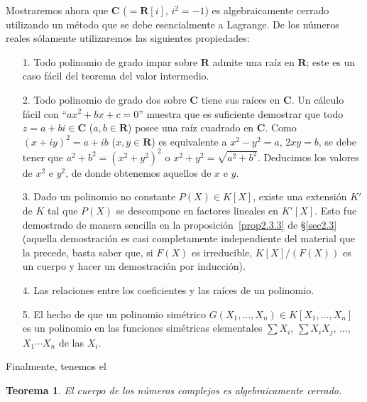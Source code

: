 \documentclass[oneside,bibtotoc,leqno,spanish]{amsbook}
\newcommand{\RR}{\mathbf{R}}
\newcommand{\CC}{\mathbf{C}}
\numberwithin{equation}{section}
\theoremstyle{defi}
\theoremstyle{note}
\newtheorem*{theorem*}{Teorema}
\theoremstyle{rem}
\numberwithin{theorem}{section}
\numberwithin{proposition}{section}
\numberwithin{definition}{section}
\numberwithin{lemma}{section}
\numberwithin{corollary}{section}
\numberwithin{example}{section}
\numberwithin{footnote}{section}%
\begin{document}
Mostraremos ahora que $\CC$ ($=\RR[i]$, $i^{2}=-1$) es algebraicamente cerrado utilizando un m\'etodo
que se debe esencialmente a Lagrange. De los n\'umeros reales s\'olamente utilizaremos
las siguientes propiedades:
\begin{enumerate}
\item[1.] Todo polinomio de grado impar sobre $\RR$ admite una ra\'iz en $\RR$; este es un caso f\'acil del teorema
del valor intermedio.
\item[2.] Todo polinomio de grado dos sobre $\CC$ tiene sus ra\'ices en $\CC$. Un c\'alculo f\'acil con
``$ax^{2}+bx+c=0$'' muestra que es suficiente demostrar que todo $z=a+bi\in\CC$ ($a,b\in\RR$) posee una
ra\'iz cuadrado en $\CC$. Como $(x+iy)^{2}=a+ib$ ($x,y\in\RR$) es equivalente a $x^{2}-y^{2}=a$,
$2xy = b$, se debe tener que $a^{2}+b^{2}=(x^{2}+y^{2})^{2}$ o $x^{2}+y^{2} = \sqrt{a^{2}+b^{2}}$. Deducimos
los valores de $x^{2}$ e $y^{2}$, de donde obtenemos aquellos de $x$ e $y$.
\item[3.] Dado un polinomio no constante $P(X)\in K[X]$, existe una extensi\'on $K'$ de $K$ tal que
$P(X)$ se descompone en factores lineales en $K'[X]$. Esto fue demostrado de manera sencilla en la
proposici\'on~\ref{prop2.3.3} de \S\ref{sec2.3} (aquella demostraci\'on es casi completamente independiente del material que la precede,
basta saber que, si $F(X)$ es irreducible, $K[X]/(F(X))$ es un cuerpo y hacer un demostraci\'on por inducci\'on).
\item[4.] Las relaciones entre los coeficientes y las ra\'ices de un polinomio.
\item[5.] El hecho de que un polinomio sim\'etrico $G(X_{1},\dots,X_{n})\in K[X_{1},\dots,X_{n}]$ es un polinomio
en las funciones sim\'etricas elementales $\sum X_{i}$, $\sum X_{i}X_{j}$, ..., $X_{1}\cdots X_{n}$ de las
$X_{i}$.
\end{enumerate}

Finalmente, tenemos el

\begin{theorem*}
El cuerpo de los n\'umeros complejos es algebraicamente cerrado.
\end{theorem*}
\end{document}
